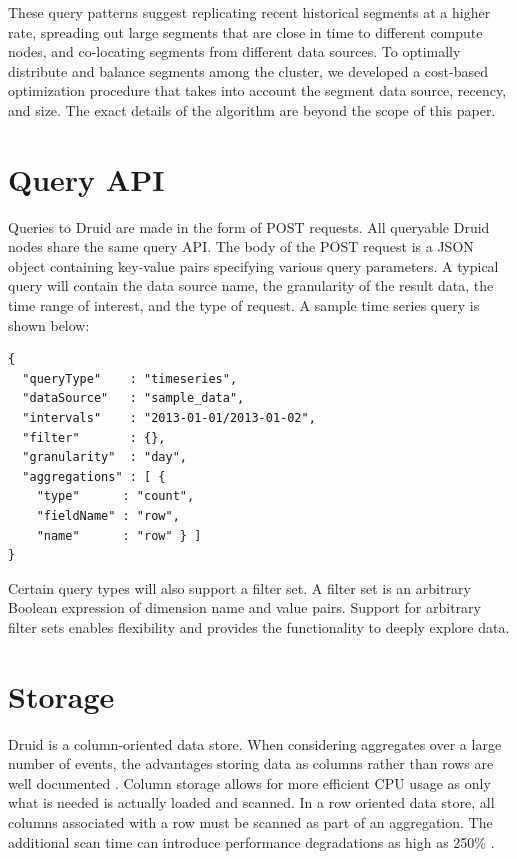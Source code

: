\documentclass{vldb}
\begin{document}
These query patterns suggest replicating recent historical segments at
a higher rate, spreading out large segments that are close in time to
different compute nodes, and co-locating segments from different data
sources.  To optimally distribute and balance segments among the
cluster, we developed a cost-based optimization procedure that takes
into account the segment data source, recency, and size. The exact
details of the algorithm are beyond the scope of this paper.

\section{Query API}
\label{sec:query-api}
Queries to Druid are made in the form of POST requests. All queryable
Druid nodes share the same query API. The body of the POST request is
a JSON object containing key-value pairs specifying various query
parameters. A typical query will contain the data source name, the
granularity of the result data, the time range of interest, and the
type of request.  A sample time series query is shown below:
\begin{verbatim}
{
  "queryType"    : "timeseries",
  "dataSource"   : "sample_data",
  "intervals"    : "2013-01-01/2013-01-02",
  "filter"       : {},
  "granularity"  : "day",
  "aggregations" : [ {
    "type"      : "count",
    "fieldName" : "row",
    "name"      : "row" } ]
}
\end{verbatim}

Certain query types will also support a filter set. A filter set is an
arbitrary Boolean expression of dimension name and value
pairs. Support for arbitrary filter sets enables flexibility and
provides the functionality to deeply explore data.

\section{Storage}
\label{sec:storage}
Druid is a column-oriented data store. When considering aggregates
over a large number of events, the advantages storing data as columns
rather than rows are well documented \cite{cattell2011scalable}. Column storage allows for
more efficient CPU usage as only what is needed is actually loaded and
scanned. In a row oriented data store, all columns associated with a
row must be scanned as part of an aggregation. The additional scan
time can introduce performance degradations as high as 250\% \cite{bear2012vertica}.
\end{document}
